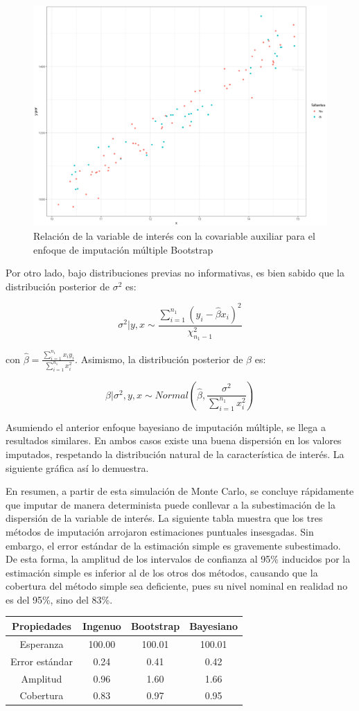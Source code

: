 \documentclass[
  12pt,
]{book}
\begin{document}
\begin{figure}
\includegraphics[width=0.5\linewidth]{Pics/im3} \caption{Relación de la variable de interés con la covariable auxiliar para el enfoque de imputación múltiple Bootstrap}\label{fig:figim3}
\end{figure}

Por otro lado, bajo distribuciones previas no informativas, es bien sabido que la distribución posterior de \(\sigma^2\) es:

\[
\sigma^2| y, x  \sim \frac{\sum_{i = 1}^{n_1} (y_i - \hat{\beta} x_i)^2}{\chi ^2_{n_1-1}}
\]

con \(\hat{\beta} = \frac{\sum_{i = 1}^{n_1} x_i y_i}{\sum_{i = 1}^{n_1} x_i^2}\). Asimismo, la distribución posterior de \(\beta\) es:

\[
\beta | \sigma^2, y, x \sim Normal \left(\hat{\beta}, \frac{\sigma^2}{\sum_{i = 1}^{n_1} x_i^2} \right)
\]

Asumiendo el anterior enfoque bayesiano de imputación múltiple, se llega a resultados similares. En ambos casos existe una buena dispersión en los valores imputados, respetando la distribución natural de la característica de interés. La siguiente gráfica así lo demuestra.

En resumen, a partir de esta simulación de Monte Carlo, se concluye rápidamente que imputar de manera determinista puede conllevar a la subestimación de la dispersión de la variable de interés. La siguiente tabla muestra que los tres métodos de imputación arrojaron estimaciones puntuales insesgadas. Sin embargo, el error estándar de la estimación simple es gravemente subestimado. De esta forma, la amplitud de los intervalos de confianza al 95\% inducidos por la estimación simple es inferior al de los otros dos métodos, causando que la cobertura del método simple sea deficiente, pues su nivel nominal en realidad no es del 95\%, sino del 83\%.

\begin{longtable}[]{@{}cccc@{}}
\toprule()
Propiedades & Ingenuo & Bootstrap & Bayesiano \\
\midrule()
\endhead
Esperanza & 100.00 & 100.01 & 100.01 \\
Error estándar & 0.24 & 0.41 & 0.42 \\
Amplitud & 0.96 & 1.60 & 1.66 \\
Cobertura & 0.83 & 0.97 & 0.95 \\
\bottomrule()
\end{longtable}
\end{document}
